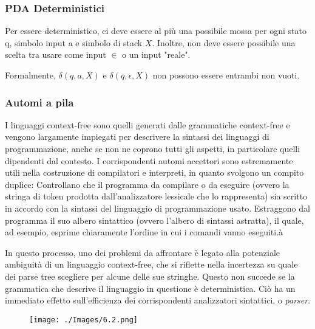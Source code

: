 \subsubsection{PDA Deterministici}

Per essere deterministico, ci deve essere al più una possibile mossa per ogni stato q, simbolo input a e simbolo di stack $X$. Inoltre, non deve essere possibile una scelta tra usare come input $\in$ o un input "reale".

Formalmente, $\delta(q, a, X)$ e $\delta(q, \epsilon, X)$ non possono essere entrambi non vuoti.

\subsubsection{Automi a pila}
I linguaggi context-free sono quelli generati dalle grammatiche
context-free e vengono largamente impiegati per descrivere la
sintassi dei linguaggi di programmazione, anche se non ne
coprono tutti gli aspetti, in particolare quelli dipendenti dal
contesto.
I corrispondenti automi accettori sono estremamente utili nella
costruzione di compilatori e interpreti, in quanto svolgono un
compito duplice:
Controllano che il programma da compilare o da eseguire
(ovvero la stringa di token prodotta dall'analizzatore lessicale
che lo rappresenta) sia scritto in accordo con la sintassi del
linguaggio di programmazione usato.
Estraggono dal programma il suo albero sintattico (ovvero
l'albero di sintassi astratta), il quale, ad esempio, esprime
chiaramente l'ordine in cui i comandi vanno eseguiti.à

\vspace{5mm}

In questo processo, uno dei problemi da affrontare è legato
alla potenziale ambiguità di un linguaggio context-free, che si
riflette nella incertezza su quale dei parse tree scegliere per
alcune delle sue stringhe.
Questo non succede se la grammatica che descrive il
linguaggio in questione è deterministica.
Ciò ha un immediato effetto sull'efficienza dei corrispondenti
analizzatori sintattici, o \textit{parser}.

\begin{figure}[hbpt!]
    \centering
    \texttt{[image: ./Images/6.2.png]}
\end{figure}
\FloatBarrier

